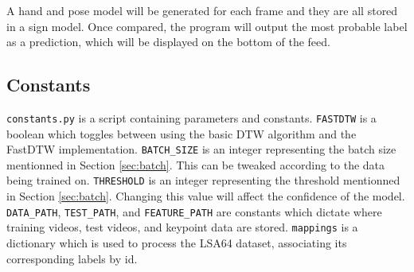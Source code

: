 \documentclass[final,rdr32.tex]{subfiles}
\begin{document}
A hand and pose model will be generated for each frame and they are all stored in a sign model. Once compared, the program will output the most probable label as a prediction, which will be displayed on the bottom of the feed.

\subsection{Constants}
\label{sec:constants}

\verb|constants.py| is a script containing parameters and constants.
\verb|FASTDTW| is a boolean which toggles between using the basic DTW algorithm and the FastDTW implementation.
\verb|BATCH_SIZE| is an integer representing the batch size mentionned in Section \ref{sec:batch}. This can be tweaked according to the data being trained on.
\verb|THRESHOLD| is an integer representing the threshold mentionned in Section \ref{sec:batch}. Changing this value will affect the confidence of the model.
\verb|DATA_PATH|, \verb|TEST_PATH|, and \verb|FEATURE_PATH| are constants which dictate where training videos, test videos, and keypoint data are stored.
\verb|mappings| is a dictionary which is used to process the LSA64 dataset, associating its corresponding labels by id.
\end{document}
